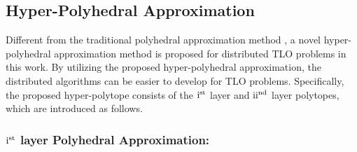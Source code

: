 \documentclass[letterpaper]{article}
\begin{document}
\subsection{Hyper-Polyhedral Approximation}
Different from the traditional polyhedral approximation method \cite{bertsekas2015convex,franc2011cutting,burger2013polyhedral}, a novel hyper-polyhedral approximation method is proposed for distributed TLO problems in this work. By utilizing the proposed hyper-polyhedral approximation,
the distributed algorithms can be easier to develop for TLO problems. Specifically, the proposed hyper-polytope consists of the ${\rm{\uppercase\expandafter{\romannumeral1}}}^{\rm{st}}$ layer and ${\rm{\uppercase\expandafter{\romannumeral2}}}^{\rm{nd}}$  layer polytopes, which are introduced as follows.


\subsubsection{${\rm{\uppercase\expandafter{\romannumeral1}}}^{\rm{st}}$ layer Polyhedral Approximation:}
\end{document}

